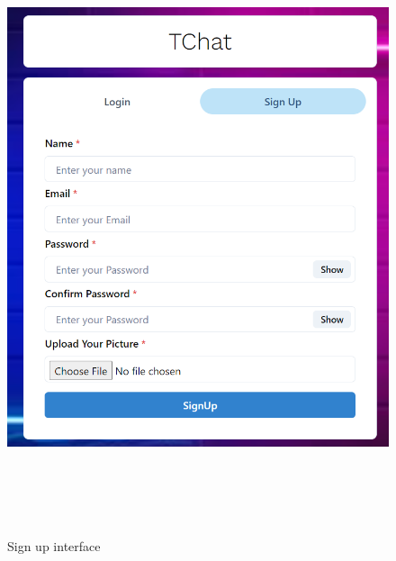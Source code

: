\begin{figure}[H]
	\centering
	\includegraphics[width=160mm, height=180mm]{images/signup.png}
	\caption{Sign up interface} %
	\label{figusecase} %
\end{figure}

